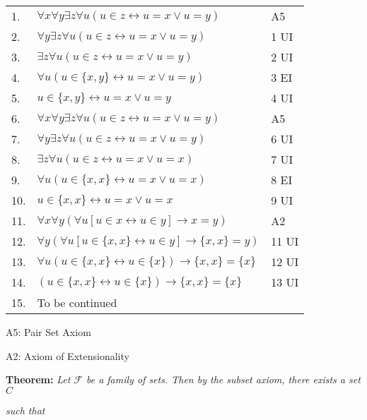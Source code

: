 \documentclass[12pt, a4paper]{article}
\begin{document}
\begin{table}[h!]
    \begin{center}
        \begin{tabular}{l l l}
        \hline
        1. & $\forall x\forall y\exists z\forall u(u\in z\leftrightarrow u=x\vee u=y)$ & A5\\
        2. & $\forall y\exists z\forall u(u\in z\leftrightarrow u=x\vee u=y)$ & 1 UI\\
        3. & $\exists z\forall u(u\in z\leftrightarrow u=x\vee u=y)$ & 2 UI\\
        4. & $\forall u(u\in\{x,y\}\leftrightarrow u=x\vee u=y)$ & 3 EI\\
        5. & $u\in\{x,y\}\leftrightarrow u=x\vee u=y$ & 4 UI\\
        6. & $\forall x\forall y\exists z\forall u(u\in z\leftrightarrow u=x\vee u=y)$ & A5\\
        7. & $\forall y\exists z\forall u(u\in z\leftrightarrow u=x\vee u=y)$ & 6 UI\\
        8. & $\exists z\forall u(u\in z\leftrightarrow u=x\vee u=x)$ & 7 UI\\
        9. & $\forall u(u\in \{x,x\}\leftrightarrow u=x\vee u=x)$ & 8 EI\\
        10.& $u\in\{x,x\}\leftrightarrow u=x\vee u=x$ & 9 UI\\
        11.& $\forall x\forall y(\forall u[u\in x\leftrightarrow u\in y]\rightarrow x=y)$ &       A2\\
        12.& $\forall y(\forall u[u\in\{x,x\}\leftrightarrow u\in y]\rightarrow \{x,x\}=y)$ &      11 UI\\
        13.& $\forall u(u\in\{x,x\}\leftrightarrow u\in\{x\})\rightarrow\{x,x\}=\{x\}$ & 12       UI\\
        14.& $(u\in\{x,x\}\leftrightarrow u\in\{x\})\rightarrow\{x,x\}=\{x\}$ & 13 UI\\
        15.& To be continued &\\
         
        
        \hline
        \end{tabular}
    \end{center}
\end{table}

\noindent A5: Pair Set Axiom\par
\noindent A2: Axiom of Extensionality

\newpage

\textbf{Theorem: }\textit{Let $\mathcal{F}$ be a family of sets. Then by the subset axiom, there exists a set $C$}\par\textit{such that}\par
\end{document}
